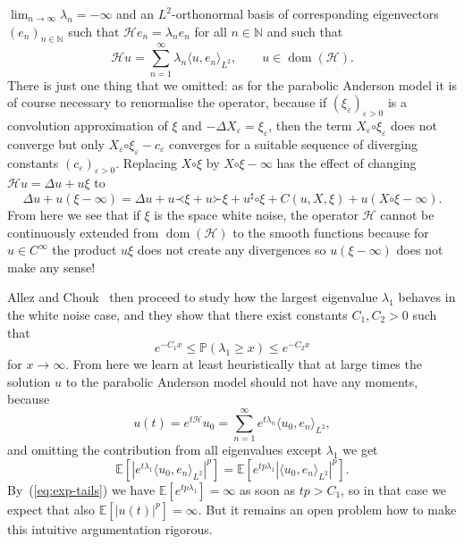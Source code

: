\documentclass[a4paper, 11pt]{article}
\newcommand{\tmop}[1]{\ensuremath{\operatorname{#1}}}
\newcommand{\para}{\mathord{\prec}}
\newcommand{\lpara}{\mathord{\succ}}
\newcommand{\reso}{\mathord{\circ}}
\begin{document}
$\lim_{n \rightarrow \infty} \lambda_n = - \infty$ and an $L^2$-orthonormal basis of
corresponding eigenvectors $(e_n)_{n \in \mathbb{N}}$ such that
$\mathcal{H}e_n = \lambda_n e_n$ for all $n \in \mathbb{N}$ and such that
\[ \mathcal{H}u = \sum_{n = 1}^{\infty} \lambda_n \langle u, e_n
   \rangle_{L^2}, \qquad u \in \tmop{dom} (\mathcal{H}) . \]
There is just one thing that we omitted: as for the parabolic Anderson model it is
of course necessary to renormalise the operator, because if
$(\xi_{\varepsilon})_{\varepsilon > 0}$ is a convolution approximation of
$\xi$ and $- \Delta X_{\varepsilon} = \xi_{\varepsilon}$, then the term
$X_{\varepsilon} \reso \xi_{\varepsilon}$ does not converge but only
$X_{\varepsilon} \reso \xi_{\varepsilon} - c_{\varepsilon}$ converges for a
suitable sequence of diverging constants $(c_{\varepsilon})_{\varepsilon >
0}$. Replacing $X \reso \xi$ by $X \reso \xi - \infty$ has the effect of
changing $\mathcal{H}u = \Delta u + u \xi$ to
\[ \Delta u + u (\xi - \infty) = \Delta u + u \para \xi + u \lpara \xi +
   u^{\sharp} \reso \xi + C (u, X, \xi) + u (X \reso \xi - \infty) . \]
From here we see that if $\xi$ is the space white noise, the operator
$\mathcal{H}$ cannot be continuously extended from $\tmop{dom} (\mathcal{H})$
to the smooth functions because for $u \in C^{\infty}$ the product $u \xi$ does
not create any divergences so $u (\xi - \infty)$ does not make any sense!

Allez and Chouk~\cite{allez_continuous_2015} then proceed to study how the
largest eigenvalue $\lambda_1$ behaves in the white noise case, and they show
that there exist constants $C_1, C_2 > 0$ such that
\begin{equation}
  \label{eq:exp-tails} e^{- C_1 x} \leqslant \mathbb{P} (\lambda_1 \geqslant
  x) \leqslant e^{- C_2 x}
\end{equation}
for $x \rightarrow \infty$. From here we learn at least heuristically that at
large times the solution $u$ to the parabolic Anderson model should not have
any moments, because
\[ u (t) =  e^{t\mathcal{H}} u_0 = \sum_{n = 1}^{\infty} e^{t \lambda_n} \langle u_0, e_n
   \rangle_{L^2}, \]
and omitting the contribution from all eigenvalues except $\lambda_1$ we get
\[ \mathbb{E} [| e^{t \lambda_1} \langle u_0, e_n \rangle_{L^2} |^p]
   =\mathbb{E} [e^{t p \lambda_1} | \langle u_0, e_n \rangle_{L^2} |^p] . \]
By~(\ref{eq:exp-tails}) we have $\mathbb{E} [e^{t p \lambda_1}] = \infty$ as
soon as $t p > C_1$, so in that case we expect that also $\mathbb{E} [| u (t) |^p] = \infty$.
But it remains an open problem how to make this intuitive argumentation
rigorous.
\end{document}
